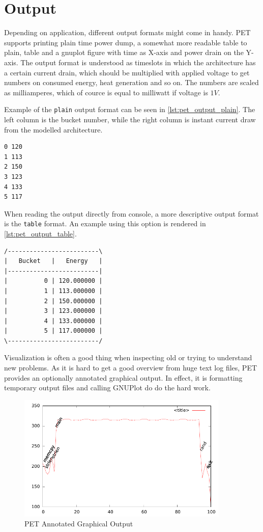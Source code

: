 \section{Output}
Depending on application, different output formats might come in handy. PET
supports printing plain time power dump, a somewhat more readable table to
plain, table and a gnuplot figure with time as X-axis and power drain on the
Y-axis. The output format is understood as timeslots in which the architecture
has a certain current drain, which should be multiplied with applied voltage to
get numbers on consumed energy, heat generation and so on. The numbers are
scaled as milliamperes, which of cource is equal to milliwatt if voltage is
$1V$.

Example of the \texttt{plain} output format can be seen in
\autoref{lst:pet_output_plain}. The left column is the bucket number, while the
right column is instant current draw from the modelled architecture.

\begin{lstlisting}[label={lst:pet_output_plain},caption={PET Plain Output}]
0 120
1 113
2 150
3 123
4 133
5 117
\end{lstlisting}

When reading the output directly from console, a more descriptive output format
is the \texttt{table} format. An example using this option is rendered in
\autoref{lst:pet_output_table}.

\begin{lstlisting}[label={lst:pet_output_table},caption={PET Table Output}]
/-------------------------\
|   Bucket   |   Energy   |
|-------------------------|
|          0 | 120.000000 |
|          1 | 113.000000 |
|          2 | 150.000000 |
|          3 | 123.000000 |
|          4 | 133.000000 |
|          5 | 117.000000 |
\-------------------------/
\end{lstlisting}

Visualization is often a good thing when inspecting old or trying to understand new
problems. As it is hard to get a good overview from huge text log files, PET provides
an optionally annotated graphical output. In effect, it is formatting temporary output
files and calling GNUPlot do do the hard work.

\begin{figure}
    \includegraphics[width=0.9\textwidth]{figs/annot.pdf}
    \caption{PET Annotated Graphical Output}
    \label{fig:annot}
\end{figure}

